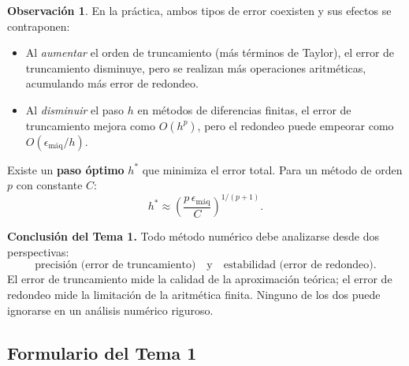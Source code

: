 \documentclass[a4paper,12pt]{article}
\theoremstyle{definition}
\newtheorem{observacion}{Observación}[section]
\theoremstyle{plain}
\begin{document}
\begin{observacion}
En la práctica, ambos tipos de error coexisten y sus efectos se contraponen:

\begin{itemize}[leftmargin=1.5em]
    \item Al \emph{aumentar} el orden de truncamiento (más términos de Taylor),
          el error de truncamiento disminuye, pero se realizan más operaciones
          aritméticas, acumulando más error de redondeo.
    \item Al \emph{disminuir} el paso $h$ en métodos de diferencias finitas,
          el error de truncamiento mejora como $O(h^p)$, pero el redondeo
          puede empeorar como $O(\epsilon_{\mathrm{máq}}/h)$.
\end{itemize}

Existe un \textbf{paso óptimo} $h^*$ que minimiza el error total. Para un
método de orden $p$ con constante $C$:
\[
    h^* \approx \left(\frac{p\,\epsilon_{\mathrm{máq}}}{C}\right)^{1/(p+1)}.
\]
\end{observacion}

\begin{cajaresultado}
\textbf{Conclusión del Tema 1.}
Todo método numérico debe analizarse desde dos perspectivas:
\[
    \text{precisión (error de truncamiento)}
    \quad \text{y} \quad
    \text{estabilidad (error de redondeo)}.
\]
El error de truncamiento mide la calidad de la aproximación teórica; el error
de redondeo mide la limitación de la aritmética finita. Ninguno de los dos
puede ignorarse en un análisis numérico riguroso.
\end{cajaresultado}

\subsection{Formulario del Tema 1}
\end{document}
